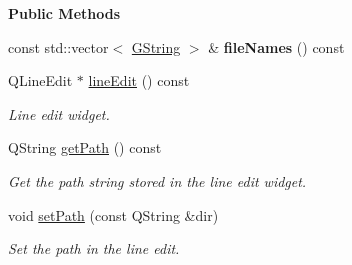 \begin{Indent}\textbf{ Public Methods}\par
\begin{DoxyCompactItemize}
\item 
\mbox{\label{classrev_1_1_view_1_1_file_load_widget_a52a6343e23c22ef4f70b6be16cdc4da9}} 
const std\+::vector$<$ \mbox{\hyperlink{classrev_1_1_g_string}{G\+String}} $>$ \& {\bfseries file\+Names} () const
\item 
\mbox{\label{classrev_1_1_view_1_1_file_load_widget_a091ba1fd53e8168b4220f942c7452c3e}} 
Q\+Line\+Edit $\ast$ \mbox{\hyperlink{classrev_1_1_view_1_1_file_load_widget_a091ba1fd53e8168b4220f942c7452c3e}{line\+Edit}} () const
\begin{DoxyCompactList}\small\item\em Line edit widget. \end{DoxyCompactList}\item 
\mbox{\label{classrev_1_1_view_1_1_file_load_widget_ad06bd85f502dfb53a5229170ef65ebba}} 
Q\+String \mbox{\hyperlink{classrev_1_1_view_1_1_file_load_widget_ad06bd85f502dfb53a5229170ef65ebba}{get\+Path}} () const
\begin{DoxyCompactList}\small\item\em Get the path string stored in the line edit widget. \end{DoxyCompactList}\item 
\mbox{\label{classrev_1_1_view_1_1_file_load_widget_a3976d8f513d6aabaa1f4a9d83b5e0ff2}} 
void \mbox{\hyperlink{classrev_1_1_view_1_1_file_load_widget_a3976d8f513d6aabaa1f4a9d83b5e0ff2}{set\+Path}} (const Q\+String \&dir)
\begin{DoxyCompactList}\small\item\em Set the path in the line edit. \end{DoxyCompactList}\end{DoxyCompactItemize}
\end{Indent}
